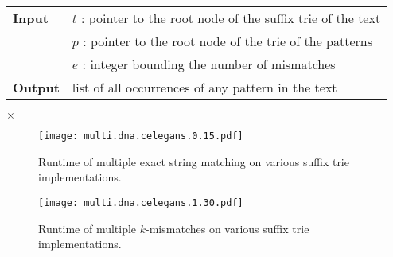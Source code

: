 \begin{center}
\begin{minipage}[t]{.8\textwidth}
\begin{algorithm}[H]
\label{alg:st-hamming-multi}
\begin{tabular}{ll}
\textbf{Input}  & $t$ : pointer to the root node of the suffix trie of the text\\
 			    & $p$ : pointer to the root node of the trie of the patterns\\
 			    & $e$ : integer bounding the number of mismatches\\
\textbf{Output} & list of all occurrences of any pattern in the text\\
\end{tabular}
\begin{algorithmic}[1]
		\State \Report {} $\times$ 
		\Repeat
			\Repeat
				\State {}
	\EndIf
\EndIf
\end{algorithmic}
\end{algorithm}
\end{minipage}
\end{center}

\begin{figure}[h]
\begin{center}
\caption[Multiple exact string matching runtime]{Runtime of multiple exact string matching on various suffix trie implementations.}
\label{fig:query-dna-exact-multi}
\texttt{[image: multi.dna.celegans.0.15.pdf]}
\end{center}
\end{figure}

\begin{figure}[h]
\begin{center}
\caption[Multiple $k$-mismatches runtime]{Runtime of multiple $k$-mismatches on various suffix trie implementations.}
\label{fig:query-dna-apx-multi}
\texttt{[image: multi.dna.celegans.1.30.pdf]}
\end{center}
\end{figure}

